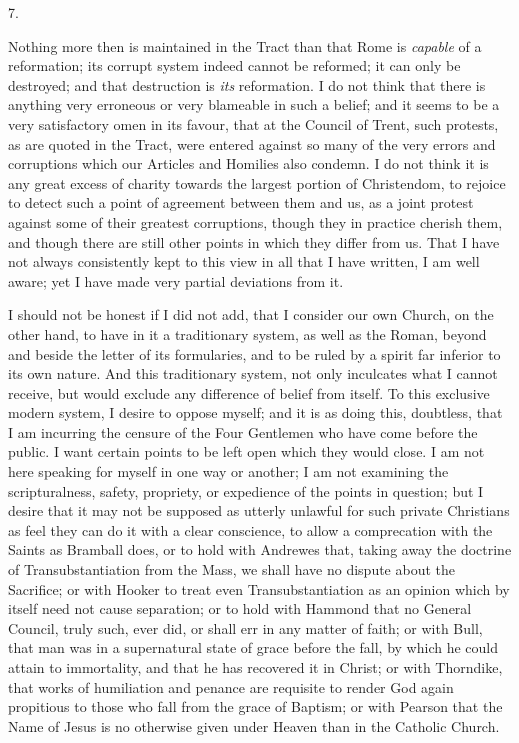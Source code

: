 7.

Nothing more then is maintained in the Tract than
that Rome is \emph{capable} of a reformation; its corrupt system
indeed cannot be reformed; it can only be destroyed; and that
destruction is \emph{its} reformation. I do not think that there is
anything very erroneous or very blameable in such a belief; and it
seems to be a very satisfactory omen in its favour, that at the
Council of Trent, such protests, as are quoted in the Tract, were
entered against so many of the very errors and corruptions which our
Articles and Homilies also condemn. I do not think it is any great
excess of charity towards the largest portion of Christendom, to
rejoice to detect such a point of agreement between them and us, as a
joint protest against some of their greatest corruptions, though they
in practice cherish them, and though there are still other points in
which they differ from us. That I have not always consistently kept to
this view in all that I have written, I am well aware; yet I have made
very partial deviations from it.

I should not be honest if I did not add, that I
consider our own Church, on the other hand, to have in it a
traditionary system, as well as the Roman, beyond and beside the
letter of its formularies, and to be ruled by a spirit far inferior to
its own nature. And this traditionary system, not only inculcates what
I cannot receive, but would exclude any difference of belief from
itself. To this exclusive modern system, I desire to oppose myself;
and it is as doing this, doubtless, that I am incurring the censure of
the Four Gentlemen who have come before the public. I want certain
points to be left open which they would close. I am not here speaking
for myself in one way or another; I am not examining the
scripturalness, safety, propriety, or expedience of the points in
question; but I desire that it may not be supposed as utterly unlawful
for such private Christians as feel they can do it with a clear
conscience, to allow a comprecation with the Saints as Bramball does,
or to hold with Andrewes that, taking away the doctrine of
Transubstantiation from the Mass, we shall have no dispute about the
Sacrifice; or with Hooker to treat even Transubstantiation as an
opinion which by itself need not cause separation; or to hold with
Hammond that no General Council, truly such, ever did, or shall err in
any matter of faith; or with Bull, that man was in a supernatural
state of grace before the fall, by which he could attain to
immortality, and that he has recovered it in Christ; or with Thorndike,
that works of humiliation and penance are requisite to render God
again propitious to those who fall from the grace of Baptism; or with
Pearson that the Name of Jesus is no otherwise given under Heaven than
in the Catholic Church.

